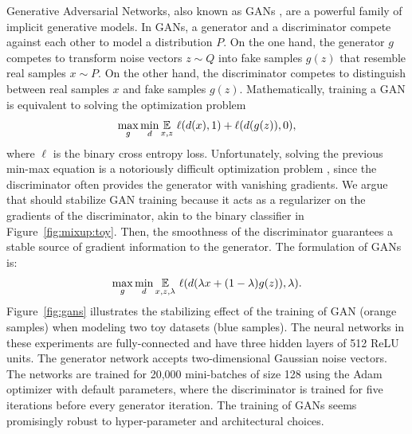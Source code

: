 Generative Adversarial Networks, also known as GANs
\citep{goodfellow2014generative}, are a powerful family of implicit generative
models.  In GANs, a generator and a discriminator compete against each other to
model a distribution $P$. On the one hand, the generator $g$ competes to
transform noise vectors $z \sim Q$ into fake samples $g(z)$ that resemble real
samples $x \sim P$.  On the other hand, the discriminator competes to
distinguish between real samples $x$ and fake samples $g(z)$. Mathematically,
training a GAN is equivalent to solving the optimization problem
\begin{equation*}
  \max_g \min_d \operatorname*{\mathbb{E}}_{x, z} \, \ell(d(x), 1) + \ell(d(g(z)), 0),
\end{equation*}
where $\ell$ is the binary cross entropy loss. Unfortunately, solving the
previous min-max equation is a notoriously difficult optimization problem
\citep{goodfellow2016nips}, since the discriminator often provides the
generator with vanishing gradients.  We argue that \mixup{} should stabilize
GAN training because it acts as a regularizer on the gradients of the
discriminator, akin to the binary classifier in Figure~\ref{fig:mixup:toy}.
Then, the smoothness of the discriminator guarantees a stable source of
gradient information to the generator. The \mixup{} formulation of GANs is:
\begin{equation*}
  \max_g \min_d \operatorname*{\mathbb{E}}_{x, z, \lambda} \, \ell(d(\lambda x + (1 - \lambda) g(z)),
  \lambda).
\end{equation*}
Figure~\ref{fig:gans} illustrates the stabilizing effect of \mixup{} the
training of GAN (orange samples) when modeling two toy datasets (blue samples).
The neural networks in these experiments are fully-connected and have three
hidden layers of 512 ReLU units. The generator network accepts two-dimensional
Gaussian noise vectors. The networks are trained for 20,000 mini-batches of
size 128 using the Adam optimizer with default parameters, where the
discriminator is trained for five iterations before every generator iteration.
The training of \mixup{} GANs seems promisingly robust to hyper-parameter and
architectural choices.

